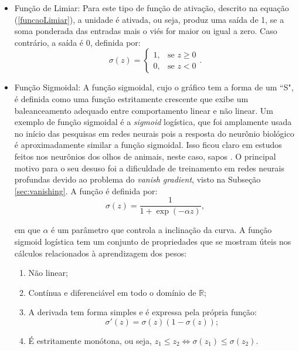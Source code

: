\begin{itemize}
    \item Função de Limiar: Para este tipo de função de ativação, descrito na equação (\ref{funcaoLimiar}), a unidade é ativada, ou seja, produz uma saída de 1, se a soma ponderada das entradas mais o viés for maior ou igual a zero. Caso contrário, a saída é 0, definida por:
    \begin{equation}
        \label{funcaoLimiar}
        \sigma(z) = \begin{cases}
        1, & \text{se } z \geq 0 \\        0, & \text{se } z < 0        \end{cases}.
    \end{equation}

    \item Função Sigmoidal: A função sigmoidal, cujo o gráfico tem a forma de um ``S", é definida como uma função estritamente crescente que exibe um baleanceamento adequado entre comportamento linear e não linear. Um exemplo de função sigmoidal é a \textit{sigmoid} logística, que foi amplamente usada no início das pesquisas em redes neurais pois a resposta do neurônio biológico é aproximadamente similar a função sigmoidal. Isso ficou claro em estudos feitos nos neurônios dos olhos de animais, neste caso, sapos \cite{Lettvin1959}. O principal motivo para o seu desuso foi a dificuldade de treinamento em redes neurais profundas devido ao problema do \textit{vanish gradient}, visto na Subseção \ref{sec:vanishing}. A função é definida por:
    \begin{equation}
    \label{eq:sigmoid}   
    \sigma(z) = \frac{1}{1+ \exp(-\alpha z)},   
    \end{equation}

    em que $\alpha$ é um parâmetro que controla a inclinação da curva. A função sigmoid logística tem um conjunto de propriedades que se mostram úteis nos cálculos relacionados à aprendizagem dos pesos:
    
    \begin{enumerate}
    \item Não linear;
    \item Contínua e diferenciável em todo o domínio de $\mathbb{R}$;
    \item A derivada tem forma simples e é expressa pela própria função: $$\sigma'(z) = \sigma(z)(1-\sigma(z));$$
    \item É estritamente monótona, ou seja, $z_1 \leq z_2 \iff \sigma(z_1) \leq \sigma(z_2)$.
    \end{enumerate}



\end{itemize}
